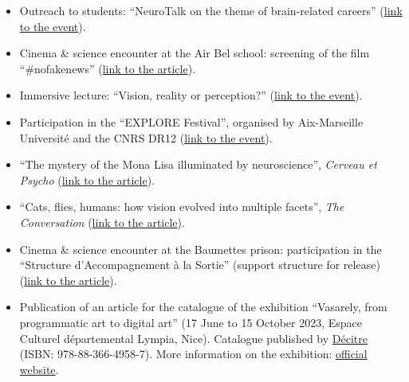\documentclass[10pt,english,a4paper,oneside]{article}%
\newcommand{\years}[1]{\marginpar{\textit{\scriptsize #1}}}
\begin{document}
\begin{itemize}
	\item Outreach to students: ``NeuroTalk on the theme of brain-related careers'' (\href{https://laurentperrinet.github.io/post/2025-11-24_neurotalk/}{link to the event}). \years{2025}

	\item Cinema \& science encounter at the Air Bel school: screening of the film ``\#nofakenews'' (\href{https://laurentperrinet.github.io/post/2025-09-23_belair-nofakenews/}{link to the article}).

	\item Immersive lecture: ``Vision, reality or perception?'' (\href{https://laurentperrinet.github.io/talk/2025-06-12_explore-conference-immersive}{link to the event}).

	\item Participation in the ``EXPLORE Festival'', organised by Aix-Marseille Université and the CNRS DR12 (\href{https://laurentperrinet.github.io/talk/2025-06-10_explore-cine-sciences}{link to the event}).

	\item ``The mystery of the Mona Lisa illuminated by neuroscience'', \textit{Cerveau et Psycho} (\href{https://laurentperrinet.github.io/post/2024-08-25-joconde/}{link to the article}). \years{2024}

	\item ``Cats, flies, humans: how vision evolved into multiple facets'', \textit{The Conversation} (\href{https://laurentperrinet.github.io/publication/perrinet-24-yeux/}{link to the article}). \years{2024}

    \item Cinema \& science encounter at the Baumettes prison: participation in the ``Structure d'Accompagnement à la Sortie'' (support structure for release) (\href{https://laurentperrinet.github.io/post/2024-05-23-lieux-fictifs/}{link to the article}).

    \item Publication of an article for the catalogue of the exhibition ``Vasarely, from programmatic art to digital art'' (17 June to 15 October 2023, Espace Culturel départemental Lympia, Nice). Catalogue published by \href{https://www.decitre.fr/livres/vasarely-9788836649587.html}{Décitre} (ISBN: 978-88-366-4958-7). More information on the exhibition: \href{https://www.departement06.fr/culture/vasarely-d-un-art-programmatique-au-numerique-13667.html}{official website}. \years{2023}


\end{itemize}
\end{document}
